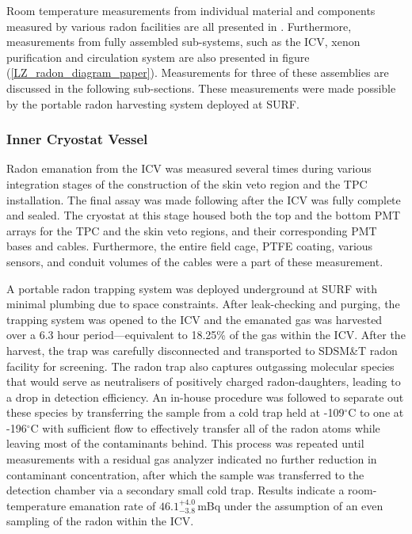 Room temperature measurements from individual material and components measured by various radon facilities are all presented in \cite{lz_screening}. Furthermore, measurements from fully assembled sub-systems, such as the ICV, xenon purification and circulation system are also presented in figure (\ref{LZ_radon_diagram_paper}). Measurements for three of these assemblies are discussed in the following sub-sections. These measurements were made possible by the portable radon harvesting system deployed at SURF. 

\subsubsection{Inner Cryostat Vessel}

Radon emanation from the ICV was measured several times during various integration stages of the construction of the skin veto region and the TPC installation. The final assay was made following after the ICV was fully complete and sealed. The cryostat at this stage housed both the top and the bottom PMT arrays for the TPC and the skin veto regions, and their corresponding PMT bases and cables. Furthermore, the entire field cage, PTFE coating, various sensors, and conduit volumes of the cables were a part of these measurement.

A portable radon trapping system was deployed underground at SURF with minimal plumbing due to space constraints. After leak-checking and purging, the trapping system was opened to the ICV and the emanated gas was harvested over a 6.3 hour period---equivalent to 18.25\% of the gas within the ICV. After the harvest, the trap was carefully disconnected and transported to SDSM\&T radon facility for screening. The radon trap also captures outgassing molecular species that would serve as neutralisers of positively charged radon-daughters, leading to a drop in detection efficiency. An in-house procedure was followed to separate out these species by transferring the sample from a cold trap held at -109$^{\circ{}}$C to one at -196$^{\circ{}}$C with sufficient flow to effectively transfer all of the radon atoms while leaving most of the contaminants behind. This process was repeated until measurements with a residual gas analyzer indicated no further reduction in contaminant concentration, after which the sample was transferred to the detection chamber via a secondary small cold trap. Results indicate a room-temperature emanation rate of $46.1^{+4.0}_{-3.8}\,$mBq under the assumption of an even sampling of the radon within the ICV.


